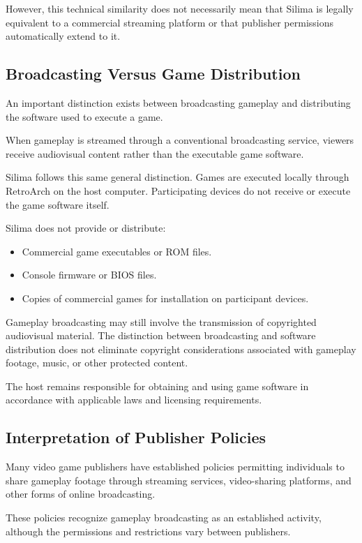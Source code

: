 However, this technical similarity does not necessarily
mean that Silima is legally equivalent to a commercial
streaming platform or that publisher permissions
automatically extend to it.

\subsection{Broadcasting Versus Game Distribution}

An important distinction exists between broadcasting
gameplay and distributing the software used to
execute a game.

When gameplay is streamed through a conventional
broadcasting service, viewers receive audiovisual
content rather than the executable game software.

Silima follows this same general distinction.
Games are executed locally through RetroArch on
the host computer. Participating devices do not
receive or execute the game software itself.

Silima does not provide or distribute:
\begin{itemize}
    \item Commercial game executables or ROM files.
    \item Console firmware or BIOS files.
    \item Copies of commercial games for installation
          on participant devices.
\end{itemize}

Gameplay broadcasting may still involve the
transmission of copyrighted audiovisual material.
The distinction between broadcasting and software
distribution does not eliminate copyright
considerations associated with gameplay footage,
music, or other protected content.

The host remains responsible for obtaining and
using game software in accordance with applicable
laws and licensing requirements.

\subsection{Interpretation of Publisher Policies}

Many video game publishers have established policies
permitting individuals to share gameplay footage
through streaming services, video-sharing platforms,
and other forms of online broadcasting.

These policies recognize gameplay broadcasting as
an established activity, although the permissions
and restrictions vary between publishers.

